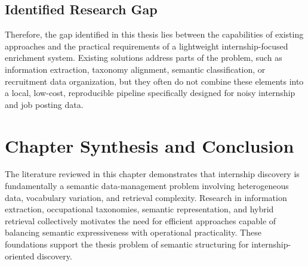 \subsection{Identified Research Gap}

Therefore, the gap identified in this thesis lies between the capabilities of existing approaches and the practical requirements of a lightweight internship-focused enrichment system. Existing solutions address parts of the problem, such as information extraction, taxonomy alignment, semantic classification, or recruitment data organization, but they often do not combine these elements into a local, low-cost, reproducible pipeline specifically designed for noisy internship and job posting data.


\section{Chapter Synthesis and Conclusion}

The literature reviewed in this chapter demonstrates that internship discovery is fundamentally
a semantic data-management problem involving heterogeneous data, vocabulary variation, and
retrieval complexity.
Research in information extraction, occupational taxonomies, semantic representation, and
hybrid retrieval collectively motivates the need for efficient approaches capable of balancing
semantic expressiveness with operational practicality.
These foundations support the thesis problem of semantic structuring for internship-oriented discovery.
